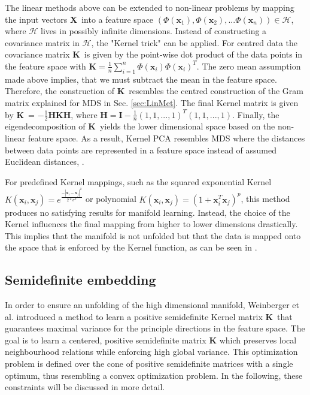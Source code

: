 \documentclass[a4paper,12pt]{article}
\newcommand{\mx}{\mathbf{x}}
\newcommand{\mH}{\mathbf{H}}
\newcommand{\mI}{\mathbf{I}}
\newcommand{\mK}{\mathbf{K}}
\newcommand{\X}{\textbf{X}}
\newcommand{\K}{\textbf{K}}
\newcommand{\mhalf}{\frac{1}{2}}
\begin{document}
The linear methods above can be extended to non-linear problems by mapping the input vectors \X \ into a feature space $(\Phi(\mx_1), \Phi(\mx_2), ... \Phi(\mx_n)) \in \mathcal{H}$, where $\mathcal{H}$ lives in  possibly infinite dimensions. Instead of constructing a covariance matrix in $\mathcal{H}$, the "Kernel trick" can be applied. For centred data the covariance matrix \K \ is given by the point-wise dot product of the data points in the feature space with \K$ = \frac{1}{n}\sum_{i = 1}^n \Phi(\mx_i)   \Phi(\mx_i)^T$.  The zero mean assumption made above implies, that we must subtract the mean in the feature space. Therefore, the construction of \K \ resembles the centred construction of the Gram matrix explained for MDS in Sec. \ref{sec:LinMet}. The final Kernel matrix is given by \K \ = $-\mhalf \mH\mathbf{K}\mH$, where $ \mH  = \mI - \frac{1}{n}(1,1, ..., 1)^T(1,1, ..., 1)$. Finally, the eigendecomposition of \K \ yields the lower dimensional space based on the non-linear feature space. 
As a result, Kernel PCA resembles MDS where the distances between data points are represented in a feature space instead of assumed Euclidean distances, \cite{Murphy3}.

For predefined Kernel mappings, such as the squared exponential Kernel $K(\mx_i,\mx_j) = e^{\frac{-|\mx_i - \mx_j|^2}{2*\sigma^2}}$ or polynomial $K(\mx_i,\mx_j) = ( 1 + \mx_i^T\mx_j)^p$, this method produces no satisfying results for manifold learning. Instead, the choice of the Kernel influences the final mapping from higher to lower dimensions drastically. This implies that the manifold is not unfolded but that the data is mapped onto the space that is enforced by the Kernel function, as can be seen in \cite{weinberger04}.

\subsection{Semidefinite embedding}
\label{SDem}
In order to ensure an unfolding of the high dimensional manifold, Weinberger et al. \cite{weinberger04} introduced a method to learn a positive semidefinite Kernel matrix \K \ that guarantees maximal variance for the principle directions  in the feature space. The goal is to learn a centered, positive semidefinite matrix $\mK$ which preserves local neighbourhood relations while enforcing high global variance. This optimization problem is defined over the cone of positive semidefinite matrices with a single optimum, thus resembling a convex optimization problem. In the following, these constraints will be discussed in more detail.
\end{document}
